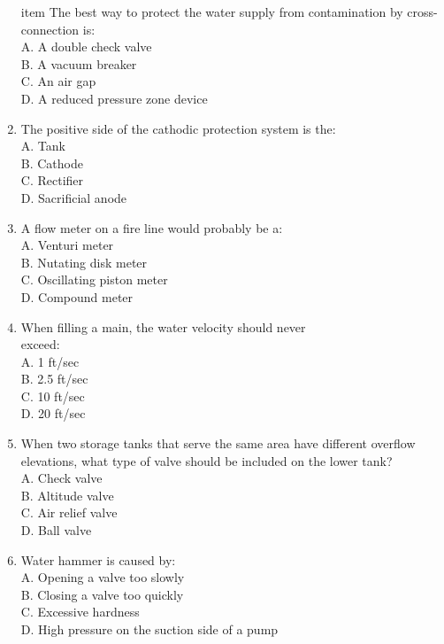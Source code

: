 \begin{enumerate}[1.]
item  The best way to protect the water supply from contamination by cross-connection is:\\
A. A double check valve\\
B. A vacuum breaker\\
C. An air gap\\
D. A reduced pressure zone device\\

\item  The positive side of the cathodic protection system is the:\\
A. Tank\\
B. Cathode\\
C. Rectifier\\
D. Sacrificial anode\\

\item  A flow meter on a fire line would probably be a:\\
A. Venturi meter\\
B. Nutating disk meter\\
C. Oscillating piston meter\\
D. Compound meter\\

\item  When filling a main, the water velocity should never\\
exceed:\\
A. 1 ft/sec\\
B. 2.5 ft/sec\\
C. 10 ft/sec\\
D. 20 ft/sec\\

\item  When two storage tanks that serve the same area have different overflow elevations, what type of valve should be included on the lower tank?\\
A. Check valve\\
B. Altitude valve\\
C. Air relief valve\\
D. Ball valve\\

\item  Water hammer is caused by:\\
A. Opening a valve too slowly\\
B. Closing a valve too quickly\\
C. Excessive hardness\\
D. High pressure on the suction side of a pump\\



\end{enumerate}
